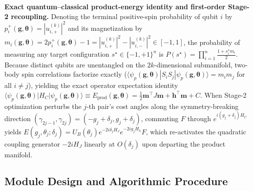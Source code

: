\documentclass[10pt,a4paper]{article}
\begin{document}
\textbf{Exact quantum--classical product-energy identity and first-order Stage-2 recoupling.} Denoting the terminal positive-spin probability of qubit $i$ by $p_i^+(\boldsymbol{g}, \boldsymbol{\theta}) = |u_{i,+}^{(k)}|^2$ and its magnetization by $m_i(\boldsymbol{g}, \boldsymbol{\theta}) = 2p_i^+(\boldsymbol{g}, \boldsymbol{\theta}) - 1 = |u_{i,+}^{(k)}|^2 - |u_{i,-}^{(k)}|^2 \in [-1, 1]$, the probability of measuring any target configuration $s^\star \in \{-1, +1\}^n$ is $P(s^\star) = \prod_{i=1}^n \frac{1 + s_i^\star m_i}{2}$. Because distinct qubits are unentangled on the $2k$-dimensional submanifold, two-body spin correlations factorize exactly ($\langle\psi_p(\boldsymbol{g}, \boldsymbol{\theta})| S_i S_j |\psi_p(\boldsymbol{g}, \boldsymbol{\theta})\rangle = m_i m_j$ for all $i \ne j$), yielding the exact operator expectation identity $\langle\psi_p(\boldsymbol{g}, \boldsymbol{\theta})| H_C |\psi_p(\boldsymbol{g}, \boldsymbol{\theta})\rangle \equiv E_{\mathrm{prod}}(\boldsymbol{g}, \boldsymbol{\theta}) = \frac{1}{2}\boldsymbol{m}^\top J\boldsymbol{m} + \boldsymbol{h}^\top\boldsymbol{m} + C$. When Stage-2 optimization perturbs the $j$-th pair's cost angles along the symmetry-breaking direction $(\gamma_{2j-1}, \gamma_{2j}) = (-g_j + \delta_j, g_j + \delta_j)$, commuting $F$ through $e^{i(g_j + \delta_j)H_C}$ yields $E(g_j, \theta_j; \delta_j) = U_B(\theta_j) e^{-2i\delta_j H_J} e^{-2i g_j H_h} F$, which re-activates the quadratic coupling generator $-2i H_J$ linearly at $O(\delta_j)$ upon departing the product manifold.


\subsection*{Module Design and Algorithmic Procedure}
\end{document}
